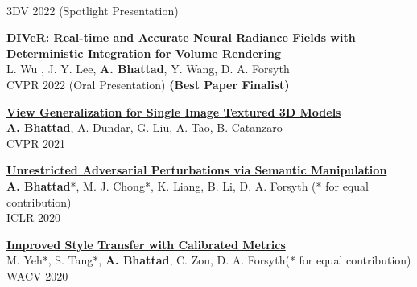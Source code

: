 \documentclass[margin,line]{res}
\begin{document}
\begin{resume}
\begin{etaremune}[start=11, leftmargin=15pt]
 \\{3DV 2022} {\color{red} (Spotlight Presentation)}
\item {\href{https://arxiv.org/abs/2111.10427}{\bf DIVeR: Real-time and Accurate Neural Radiance Fields with Deterministic Integration for Volume Rendering}  \\{ L. Wu ,   J. Y. Lee,   {\bf A. Bhattad},    Y. Wang,    D. A. Forsyth}
 \\{CVPR 2022} {\color{red} (Oral Presentation)} {\bf \color{red} (Best Paper Finalist)}}
\item {\bf \href{https://arxiv.org/abs/2106.06533}{View Generalization for Single Image Textured 3D Models}} \\{{\bf A. Bhattad}, A. Dundar, G. Liu, A. Tao, B. Catanzaro \\{CVPR 2021}}
\item {\bf \href{https://openreview.net/forum?id=Sye_OgHFwH}{Unrestricted Adversarial Perturbations via Semantic Manipulation}} \\{{\bf A. Bhattad}*, M. J. Chong*, K. Liang, B. Li, D. A. Forsyth \hfill{(* for equal contribution)}}\\{ICLR 2020} 
\item {\bf \href{https://arxiv.org/abs/1910.09447}{Improved Style Transfer with Calibrated Metrics}}\\
{M. Yeh*, S. Tang*, {\bf A. Bhattad}, C. Zou, D. A. Forsyth\hfill{(* for equal contribution)}} \\
{WACV 2020}
\end{etaremune}

\end{resume}
\end{document}
